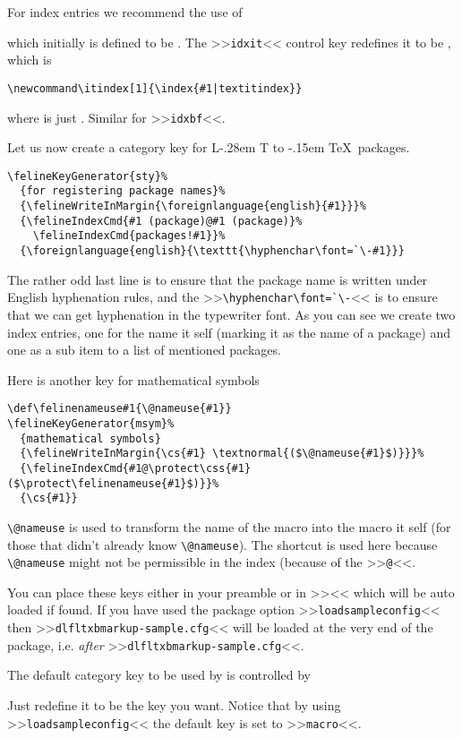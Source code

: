 \documentclass[11pt,oneside,a4paper,oldfontcommands,danish,english,article]{memoir}
\makeatletter
\DeclareRobustCommand{\LaTeX}{L\kern-.28em%
        {\sbox\z@ T%
         \vbox to\ht\z@{\hbox{\check@mathfonts
                              \fontsize\sf@size\z@
                              \math@fontsfalse\selectfont
                              A}%
                        \vss}%
        }%
        \kern-.15em%
        \TeX}
\makeatother
\begin{document}
For index entries we recommend the use of
\begin{syntax}
\end{syntax}
which initially is defined to be . The
>>\texttt{idxit}<< control key redefines it to be
, which is
\begin{verbatim}
\newcommand\itindex[1]{\index{#1|textitindex}}
\end{verbatim}
where  is just
. Similar for >>\texttt{idxbf}<<.

Let us now create a category key for \LaTeX\ packages.
\begin{verbatim}
\felineKeyGenerator{sty}%
  {for registering package names}%
  {\felineWriteInMargin{\foreignlanguage{english}{#1}}}%
  {\felineIndexCmd{#1 (package)@#1 (package)}%
    \felineIndexCmd{packages!#1}}%
  {\foreignlanguage{english}{\texttt{\hyphenchar\font=`\-#1}}}
\end{verbatim}
The rather odd last line is to ensure that the package name is written
under English hyphenation rules, and the
>>\verb+\hyphenchar\font=`\-+<< is to ensure that we can get
hyphenation in the typewriter font. As you can see we create two index
entries, one for the name it self (marking it as the name of a
package) and one as a sub item to a list of mentioned packages.

Here is another key for mathematical symbols
\begin{verbatim}
\def\felinenameuse#1{\@nameuse{#1}}
\felineKeyGenerator{msym}%
  {mathematical symbols}
  {\felineWriteInMargin{\cs{#1} \textnormal{($\@nameuse{#1}$)}}}%
  {\felineIndexCmd{#1@\protect\css{#1} ($\protect\felinenameuse{#1}$)}}%
  {\cs{#1}}
\end{verbatim}
\verb+\@nameuse+ is used to transform the name of the macro into the
macro it self (for those that didn't already know
\verb+\@nameuse+). The shortcut  is used
here because \verb+\@nameuse+ might not be permissible in the index
(because of the >>\texttt{@}<<.

You can place these keys either in your preamble or in
>><< which will be auto loaded if found. If
you have used the package option >>\texttt{loadsampleconfig}<<
then >>\texttt{dlfltxbmarkup-sample.cfg}<< will be loaded at the very end of
the package, i.e. \emph{after} >>\texttt{dlfltxbmarkup-sample.cfg}<<.

The default category key to be used by  is
controlled by
\begin{syntax}
\end{syntax}
Just redefine it to be the key you want. Notice that by using
>>\texttt{loadsampleconfig}<< the default key is set to
>>\texttt{macro}<<. 
\end{document}
